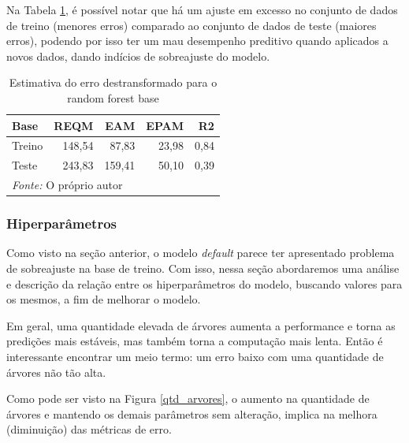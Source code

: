 \documentclass[
	12pt,				%
	a4paper,		%
	oneside,    %
	chapter=TITLE,		   %
	section=TITLE,		   %
	subsection=TITLE,	   %
	subsubsection=TITLE, %
	english,			%
	french,				%
	spanish,			%
	brazil,				%
]{abntex2}
\begin{document}
Na Tabela \ref{tab:rf0_metricas}, é possível notar que há um ajuste em
excesso no conjunto de dados de treino (menores erros) comparado ao
conjunto de dados de teste (maiores erros), podendo por isso ter um mau
desempenho preditivo quando aplicados a novos dados, dando indícios de
sobreajuste do modelo.

\begin{table}

\caption{\label{tab:rf0_metricas}Estimativa do erro destransformado para o random forest base}
\centering
\begin{tabular}[t]{l|r|r|r|r}
\hline
Base & REQM & EAM & EPAM & R2\\
\hline
Treino & 148,54 & 87,83 & 23,98 & 0,84\\
\hline
Teste & 243,83 & 159,41 & 50,10 & 0,39\\
\hline
\multicolumn{5}{l}{\textit{Fonte: } O próprio autor}\\
\end{tabular}
\end{table}

\hypertarget{hiperparuxe2metros}{%
\subsubsection{Hiperparâmetros}\label{hiperparuxe2metros}}

Como visto na seção anterior, o modelo \emph{default} parece ter
apresentado problema de sobreajuste na base de treino. Com isso, nessa
seção abordaremos uma análise e descrição da relação entre os
hiperparâmetros do modelo, buscando valores para os mesmos, a fim de
melhorar o modelo.

Em geral, uma quantidade elevada de árvores aumenta a performance e
torna as predições mais estáveis, mas também torna a computação mais
lenta. Então é interessante encontrar um meio termo: um erro baixo com
uma quantidade de árvores não tão alta.

Como pode ser visto na Figura \ref{qtd_arvores}, o aumento na quantidade
de árvores e mantendo os demais parâmetros sem alteração, implica na
melhora (diminuição) das métricas de erro.
\end{document}
